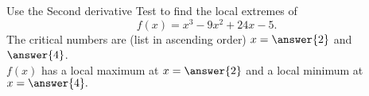 \documentclass{ximera}
\begin{document}
\begin{problem}
Use the Second derivative Test to find the local extremes of
\[
f(x) = x^3 - 9x^2 + 24x - 5.
\]
The critical numbers are (list in ascending order) $x= \answer{2}$ and $\answer{4}$.\\
$f(x)$ has a local maximum at $x = \answer{2}$ and a local minimum at $x = \answer{4}.$
\end{problem}
\end{document}
